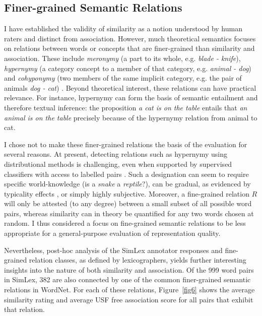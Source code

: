 \subsection{Finer-grained Semantic Relations}

I have established the validity of similarity as a notion understood by human raters and distinct from association. However, much theoretical semantics focuses on relations between words or concepts that are finer-grained than similarity and association. These include \emph{meronymy} (a part to its whole, e.g. \emph{blade - knife}), \emph{hypernymy} (a category concept to a member of that category, e.g. \emph{animal - dog}) and \emph{cohyponymy} (two members of the same implicit category, e.g. the pair of animals \emph{dog - cat}) \citep{cruse1986lexical}. Beyond theoretical interest, these relations can have practical relevance. For instance, hypernymy can form the basis of semantic entailment and therefore textual inference: the proposition \emph{a cat is on the table} entails that \emph{an animal is on the table} precisely because of the hypernymy relation from animal to cat. 

I chose not to make these finer-grained relations the basis of the evaluation for several reasons. At present, detecting relations such as hypernymy using distributional methods is challenging, even when supported by supervised classifiers with access to labelled pairs \citep{levy2015supervised}. Such a designation can seem to require specific world-knowledge (is a \emph{snake} a \emph{reptile}?), can be gradual, as evidenced by typicality effects \citep{rosch1976structural}, or simply highly subjective. Moreover, a fine-grained relation \(R\) will only be attested (to any degree) between a small subset of all possible word pairs, whereas similarity can in theory be quantified for any two words chosen at random. I thus considered a focus on fine-grained semantic relations to be less appropriate for a general-purpose evaluation of representation quality.  

Nevertheless, post-hoc analysis of the SimLex annotator responses and fine-grained relation classes, as defined by lexicographers, yields further interesting insights into the nature of both similarity and association. Of the 999 word pairs in SimLex, 382 are also connected by one of the common finer-grained semantic relations in WordNet. For each of these relations, Figure~\ref{fig6} shows the average similarity rating and average USF free association score for all pairs that exhibit that relation. 

